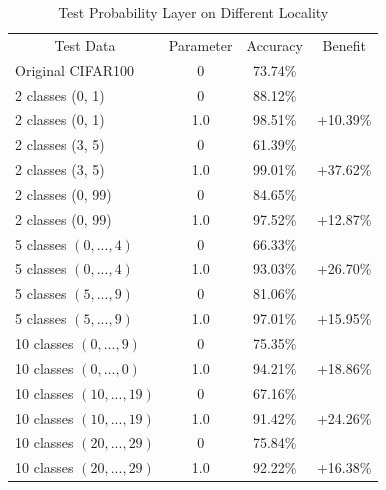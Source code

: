 \documentclass{article}
\begin{document}
\begin{table}[!th]
    \centering
    \begin{tabular}{l|c|c|c}
        \hline
        \multicolumn{1}{c|}{Test Data} & Parameter  & Accuracy & Benefit \\
        Original CIFAR100 & 0 & 73.74\% &  \\
        \hline
        2 classes (0, 1) & 0 & 88.12\% &  \\
        2 classes (0, 1) & 1.0 & 98.51\% & +10.39\% \\
        \hline
        2 classes (3, 5) & 0 & 61.39\% &  \\
        2 classes (3, 5) & 1.0 & 99.01\% & +37.62\% \\
        \hline
        2 classes (0, 99) & 0 & 84.65\% & \\
        2 classes (0, 99) & 1.0 & 97.52\% & +12.87\% \\
        \hline
        5 classes $(0, ..., 4)$ & 0 & 66.33\% &  \\
        5 classes $(0, ..., 4)$ & 1.0 & 93.03\% & +26.70\% \\
        \hline
        5 classes $(5, ..., 9)$ & 0 & 81.06\% &  \\
        5 classes $(5, ..., 9)$ & 1.0 & 97.01\% & +15.95\% \\
        \hline
        10 classes $(0, ..., 9)$ & 0 & 75.35\% &  \\
        10 classes $(0, ..., 0)$ & 1.0 & 94.21\% & +18.86\% \\
        \hline
        10 classes $(10, ..., 19)$ & 0 & 67.16\% &  \\
        10 classes $(10, ..., 19)$ & 1.0 & 91.42\% & +24.26\% \\
        \hline
        10 classes $(20, ..., 29)$ & 0 & 75.84\% &  \\
        10 classes $(20, ..., 29)$ & 1.0 & 92.22\% & +16.38\% \\
        \hline
        
        
    \end{tabular}
    \vspace{1em}
    \caption{Test Probability Layer on Different Locality}
    \label{tab:ProbabilityLayer1}
\end{table}
\end{document}
